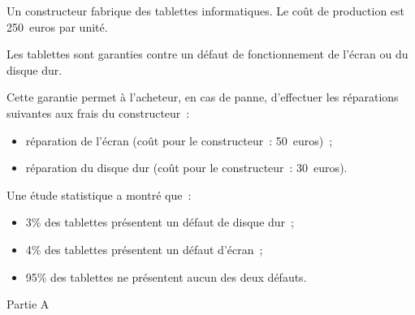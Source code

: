 
\par
{}
\par
Un constructeur fabrique des tablettes informatiques. Le coût de production est 250~euros par unité.
\par
Les tablettes sont garanties contre un défaut de fonctionnement de l'écran ou du disque dur.
\par
Cette garantie permet à l'acheteur, en cas de panne, d'effectuer les réparations suivantes aux frais du constructeur~:
\begin{itemize}
     \item réparation de l'écran (coût pour le constructeur~: 50~euros)~;
     \item réparation du disque dur (coût pour le constructeur~: 30~euros).
\end{itemize}
Une étude statistique a montré que~:
\begin{itemize}
     \item 3\% des tablettes présentent un défaut de disque dur~;
     \item 4\% des tablettes présentent un défaut d'écran~;
     \item 95\% des tablettes ne présentent aucun des deux défauts.
\end{itemize}
%
%
\begin{center}\begin{h3}Partie A \end{h3}\end{center}
%
%
